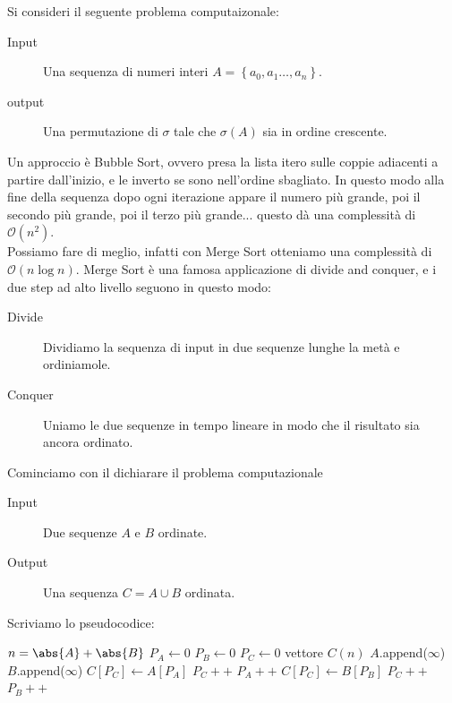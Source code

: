 \documentclass[11pt]{scrartcl}
\newcommand{\bigo}{\mathcal{O}}
\begin{document}
	\begin{example}
		Si consideri il seguente problema computaizonale:
		\begin{description}
			\item[Input] Una sequenza di numeri interi $A=\left\{a_0,a_1\dots,a_n\right\}$.
			\item[output] Una permutazione di $\sigma$ tale che $\sigma(A)$ sia in ordine crescente. 
		\end{description}
	\end{example}
	Un approccio è Bubble Sort, ovvero presa la lista itero sulle coppie adiacenti a partire dall'inizio, e le inverto se sono nell'ordine sbagliato. In questo modo alla fine della sequenza dopo ogni iterazione appare il numero più grande, poi il secondo più grande, poi il terzo più grande... questo dà una complessità di $\bigo(n^2)$. \\
	Possiamo fare di meglio, infatti con Merge Sort otteniamo una complessità di $\bigo(n\log n)$. Merge Sort è una famosa applicazione di divide and conquer, e i due step ad alto livello seguono in questo modo:
	\begin{description}
		\item[Divide] Dividiamo la sequenza di input in due sequenze lunghe la metà e ordiniamole.
		\item[Conquer] Uniamo le due sequenze in tempo lineare in modo che il risultato sia ancora ordinato.
	\end{description}
	
	\begin{algorithm}[Merging]
		Cominciamo con il dichiarare il problema computazionale
		\begin{description}
			\item[Input] Due sequenze $A$ e $B$ ordinate.
			\item[Output] Una sequenza $C=A\cup B$ ordinata.
		\end{description}
		Scriviamo lo pseudocodice:
		\begin{algorithmic}[1]
			\State $n=\abs{A}+\abs{B}$
			\State $P_A \gets 0$
			\State $P_B \gets 0$
			\State $P_C \gets 0$
			\State vettore $C(n)$
			\State $A$.append($\infty$)
			\State $B$.append($\infty$)
					\State $C[P_C]\gets A[P_A]$
					\State $P_C++$
					\State $P_A++$
				\Else
					\State $C[P_C]\gets B[P_B]$
					\State $P_C++$
					\State $P_B++$
				\EndIf
			\EndWhile
		\end{algorithmic}
	\end{algorithm}
	
\end{document}
